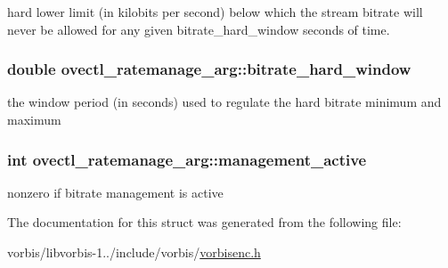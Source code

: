 hard lower limit (in kilobits per second) below which the stream bitrate will never be allowed for any given bitrate\+\_\+hard\+\_\+window seconds of time. \hypertarget{structovectl__ratemanage__arg_a68caf36fc02a52199705fa331d118446}{
\subsubsection[{bitrate\+\_\+hard\+\_\+window}]{\setlength{\rightskip}{0pt plus 5cm}double ovectl\+\_\+ratemanage\+\_\+arg\+::bitrate\+\_\+hard\+\_\+window}}\label{structovectl__ratemanage__arg_a68caf36fc02a52199705fa331d118446}
the window period (in seconds) used to regulate the hard bitrate minimum and maximum \hypertarget{structovectl__ratemanage__arg_ad792d1b89a5d07f0f0e90509df4bc606}{
\subsubsection[{management\+\_\+active}]{\setlength{\rightskip}{0pt plus 5cm}int ovectl\+\_\+ratemanage\+\_\+arg\+::management\+\_\+active}}\label{structovectl__ratemanage__arg_ad792d1b89a5d07f0f0e90509df4bc606}
nonzero if bitrate management is active 

The documentation for this struct was generated from the following file\+:\begin{DoxyCompactItemize}
\item 
vorbis/libvorbis-\/1../include/vorbis/\hyperlink{vorbisenc_8h}{vorbisenc.\+h}\end{DoxyCompactItemize}
